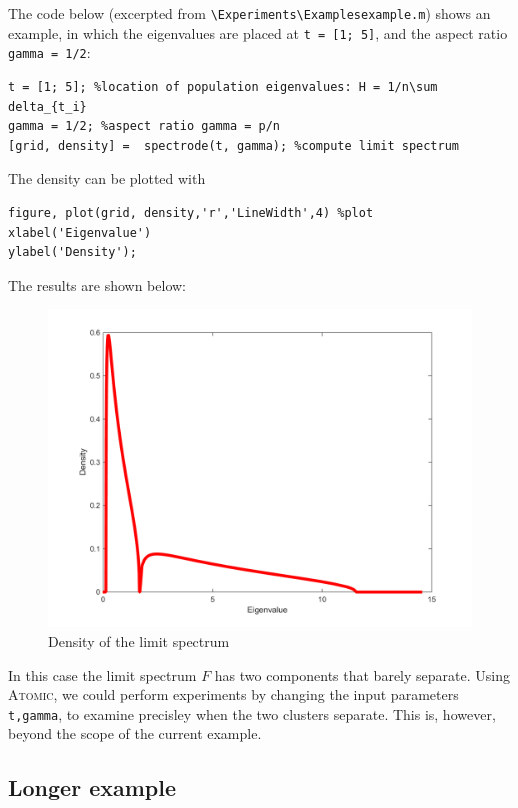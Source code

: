 \documentclass[english,11pt]{article} %
\begin{document}
The code below (excerpted from \verb+\Experiments\Examplesexample.m+) shows an example, in which the eigenvalues are placed at \verb+t = [1; 5]+, and the aspect ratio \verb+gamma = 1/2+:


\begin{verbatim}
t = [1; 5]; %location of population eigenvalues: H = 1/n\sum delta_{t_i}
gamma = 1/2; %aspect ratio gamma = p/n
[grid, density] =  spectrode(t, gamma); %compute limit spectrum
\end{verbatim}

The density can be plotted with 

\begin{verbatim}
figure, plot(grid, density,'r','LineWidth',4) %plot
xlabel('Eigenvalue')
ylabel('Density');
\end{verbatim}

The results are shown below:

\begin{figure}[ht!]
\centering
\includegraphics[scale=0.5]{"../Experiments/Examples/quick_example"}
\caption{Density of the limit spectrum}
\label{scatter_prior_current}
\end{figure}

In this case the limit spectrum $F$ has two components that barely separate. Using \textsc{Atomic}, we could perform experiments by changing the input parameters \verb+t,gamma+, to examine precisley when the two clusters separate. This is, however, beyond the scope of the current example.

\subsection{Longer example}
\end{document}
